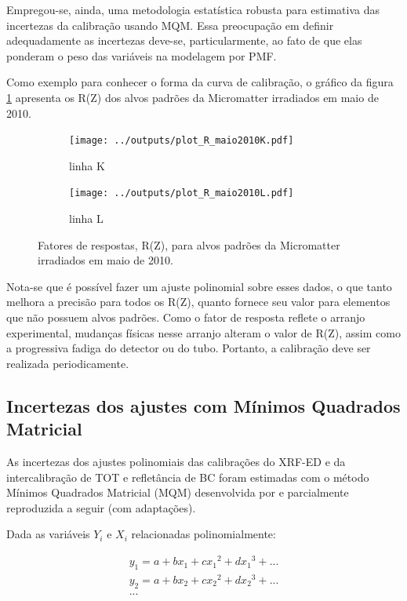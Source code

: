 Empregou-se, ainda, uma metodologia estatística robusta para estimativa das 
incertezas da calibração usando MQM. Essa preocupação em definir 
adequadamente as incertezas deve-se, particularmente, ao fato de que elas 
ponderam o peso das variáveis na modelagem por PMF.

Como exemplo para conhecer o forma da curva de calibração, o gráfico da figura 
\ref{fg:edxrfcalib} apresenta os R(Z) dos alvos padrões da Micromatter 
irradiados em maio de 2010. 

\begin{figure}[H]
  \begin{subfigure}[b]{0.45\textwidth}
    \texttt{[image: ../outputs/plot\_R\_maio2010K.pdf]}
    \caption{linha K}
  \end{subfigure}%
  \begin{subfigure}[b]{0.45\textwidth}
    \texttt{[image: ../outputs/plot\_R\_maio2010L.pdf]}
    \caption{linha L}
  \end{subfigure}
  \caption{Fatores de respostas, R(Z), para alvos padrões da 
           Micromatter irradiados em maio de 2010. 
           \label{fg:edxrfcalib}}
\end{figure}

Nota-se que é possível fazer um ajuste polinomial sobre esses dados, 
o que tanto melhora a precisão para todos os R(Z), quanto fornece seu valor
para elementos que não possuem alvos padrões. Como o fator de resposta reflete 
o arranjo experimental, mudanças físicas
nesse arranjo alteram o valor de R(Z), assim como a progressiva fadiga do detector
ou do tubo. Portanto, a calibração deve ser realizada periodicamente.

\subsection{Incertezas dos ajustes com Mínimos Quadrados Matricial}

As incertezas dos ajustes polinomiais das calibrações do XRF-ED e da 
intercalibração de TOT e refletância de BC foram estimadas com o método 
Mínimos Quadrados Matricial (MQM) desenvolvida por \citet{helene2006}
e parcialmente reproduzida a seguir (com adaptações).

Dada as variáveis $Y_i$ e $X_i$ relacionadas polinomialmente:

\begin{equation}
  \label{eq:polinomio}
  \begin{split}
    y_1 = a + b x_1 + c{x_1}^2 + d{x_1}^3 + ...\\
    y_2 = a + b x_2 + c{x_2}^2 + d{x_2}^3 + ... \\
    ...
  \end{split}
\end{equation}

